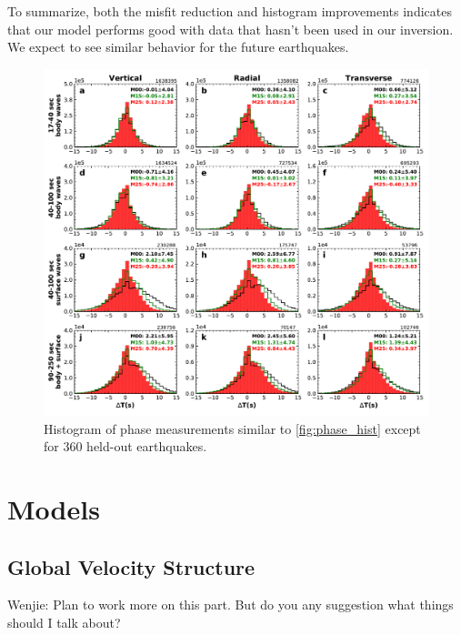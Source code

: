 \documentclass[extra,mreferee]{gji}
\begin{document}
To summarize, both the misfit reduction and histogram improvements indicates that our model performs good with data that hasn't been used in our inversion. We expect to see similar behavior for the future earthquakes.

\begin{figure}
  \centering
  \includegraphics[width=\textwidth]{figures/dt_histogram_360.pdf}
  \caption{Histogram of phase measurements similar to \ref{fig:phase_hist} except for 360 held-out earthquakes.}
  \label{fig:phase_hist_360}
\end{figure}



\section{Models}

\subsection{Global Velocity Structure}

{\color{Red} Wenjie: Plan to work more on this part. But do you any suggestion what things should I talk about?}
\end{document}
